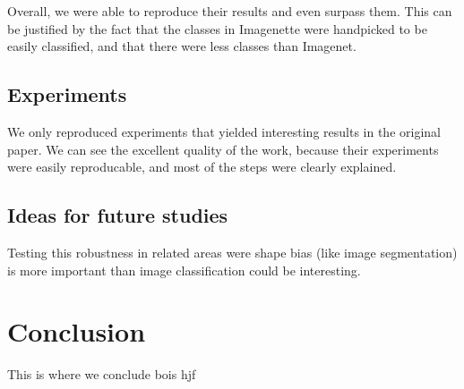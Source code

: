 \documentclass{article}
\begin{document}
Overall, we were able to reproduce their results and
even surpass them. This can be justified by the fact that the classes
in Imagenette were handpicked to be easily classified, and that there were less 
classes than Imagenet.

\subsection{Experiments}

We only reproduced experiments that yielded interesting results 
in the original paper. We can see the excellent quality of the work, 
because their experiments were easily reproducable, and most of the 
steps were clearly explained.

\subsection{Ideas for future studies}

Testing this robustness in related areas were shape bias (like image segmentation) 
is more important than image classification could be interesting.

\newpage
\section{Conclusion}

This is where we conclude bois hjf






\end{document}
